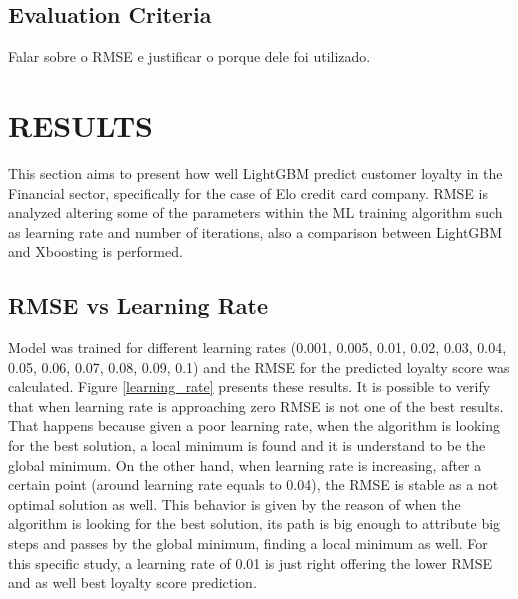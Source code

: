 \documentclass[letterpaper, 10 pt, conference]{ieeeconf}  %
\begin{document}
\subsection{Evaluation Criteria}
Falar sobre o RMSE e justificar o porque dele foi utilizado.


\section{RESULTS}
This section aims to present how well LightGBM predict customer loyalty in the Financial sector, specifically for the case of Elo credit card company. RMSE is analyzed altering some of the parameters within the ML training algorithm such as learning rate and number of iterations, also a comparison between LightGBM and Xboosting is performed.

\subsection{RMSE vs Learning Rate}
Model was trained for different learning rates (0.001, 0.005, 0.01, 0.02, 0.03, 0.04, 0.05, 0.06, 0.07, 0.08, 0.09, 0.1) and the RMSE for the predicted loyalty score was calculated. Figure \ref{learning_rate} presents these results. It is possible to verify that when learning rate is approaching zero RMSE is not one of the best results. That happens because given a poor learning rate, when the algorithm is looking for the best solution, a local minimum is found and it is understand to be the global minimum. On the other hand, when learning rate is increasing, after a certain point (around learning rate equals to 0.04), the RMSE is stable as a not optimal solution as well. This behavior is given by the reason of when the algorithm is looking for the best solution, its path is big enough to attribute big steps and passes by the global minimum, finding a local minimum as well. For this specific study, a learning rate of 0.01 is just right offering the lower RMSE and as well best loyalty score prediction.
\end{document}
